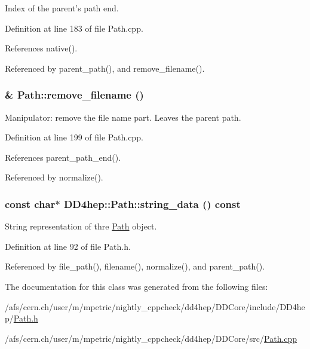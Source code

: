 Index of the parent's path end. 

Definition at line 183 of file Path.cpp.

References native().

Referenced by parent\_\-path(), and remove\_\-filename().\hypertarget{class_d_d4hep_1_1_path_aa969a2f648dce5181c569478cd69c0be}{
\subsubsection[{remove\_\-filename}]{ \& Path::remove\_\-filename ()}}
\label{class_d_d4hep_1_1_path_aa969a2f648dce5181c569478cd69c0be}


Manipulator: remove the file name part. Leaves the parent path. 

Definition at line 199 of file Path.cpp.

References parent\_\-path\_\-end().

Referenced by normalize().\hypertarget{class_d_d4hep_1_1_path_aac27606d4acb5641d6a5b3e4a4c2f3bb}{
\subsubsection[{string\_\-data}]{\setlength{\rightskip}{0pt plus 5cm}const char$\ast$ DD4hep::Path::string\_\-data () const}}
\label{class_d_d4hep_1_1_path_aac27606d4acb5641d6a5b3e4a4c2f3bb}


String representation of thre \hyperlink{class_d_d4hep_1_1_path}{Path} object. 

Definition at line 92 of file Path.h.

Referenced by file\_\-path(), filename(), normalize(), and parent\_\-path().

The documentation for this class was generated from the following files:\begin{DoxyCompactItemize}
\item 
/afs/cern.ch/user/m/mpetric/nightly\_\-cppcheck/dd4hep/DDCore/include/DD4hep/\hyperlink{_path_8h}{Path.h}\item 
/afs/cern.ch/user/m/mpetric/nightly\_\-cppcheck/dd4hep/DDCore/src/\hyperlink{_path_8cpp}{Path.cpp}\end{DoxyCompactItemize}
